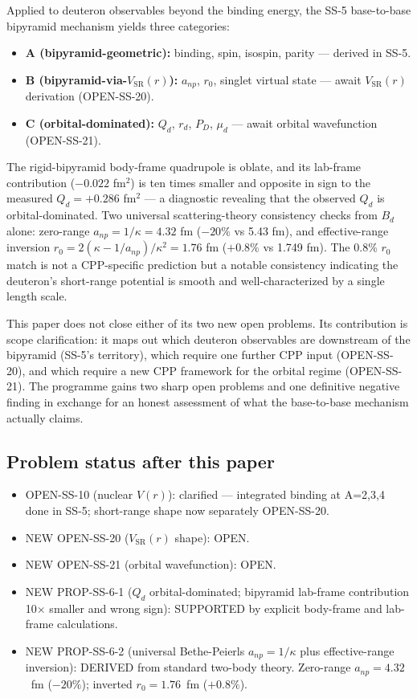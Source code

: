 \documentclass[11pt,letterpaper]{article}
\newcommand{\Bd}{B_{d}}
\newcommand{\Qd}{Q_{d}}
\newcommand{\PD}{P_{D}}
\newcommand{\mud}{\mu_{d}}
\newcommand{\anp}{a_{np}}
\newcommand{\rzero}{r_{0}}
\newcommand{\VSR}{V_{\mathrm{SR}}}
\begin{document}
Applied to deuteron observables beyond the binding energy, the SS-5 base-to-base bipyramid mechanism yields three categories:
\begin{itemize}
\item \textbf{A (bipyramid-geometric):} binding, spin, isospin, parity --- derived in SS-5.
\item \textbf{B (bipyramid-via-$\VSR(r)$):} $\anp$, $\rzero$, singlet virtual state --- await $\VSR(r)$ derivation (OPEN-SS-20).
\item \textbf{C (orbital-dominated):} $\Qd$, $r_d$, $\PD$, $\mud$ --- await orbital wavefunction (OPEN-SS-21).
\end{itemize}

The rigid-bipyramid body-frame quadrupole is oblate, and its lab-frame contribution ($-0.022$ fm$^2$) is ten times smaller and opposite in sign to the measured $\Qd = +0.286$ fm$^2$ --- a diagnostic revealing that the observed $\Qd$ is orbital-dominated. Two universal scattering-theory consistency checks from $\Bd$ alone: zero-range $\anp = 1/\kappa = 4.32$ fm ($-20\%$ vs 5.43 fm), and effective-range inversion $\rzero = 2(\kappa - 1/\anp)/\kappa^2 = 1.76$ fm ($+0.8\%$ vs 1.749 fm). The 0.8\% $\rzero$ match is not a CPP-specific prediction but a notable consistency indicating the deuteron's short-range potential is smooth and well-characterized by a single length scale.

This paper does not close either of its two new open problems. Its contribution is scope clarification: it maps out which deuteron observables are downstream of the bipyramid (SS-5's territory), which require one further CPP input (OPEN-SS-20), and which require a new CPP framework for the orbital regime (OPEN-SS-21). The programme gains two sharp open problems and one definitive negative finding in exchange for an honest assessment of what the base-to-base mechanism actually claims.

\subsection{Problem status after this paper}

\begin{itemize}
\item OPEN-SS-10 (nuclear $V(r)$): clarified --- integrated binding at A=2,3,4 done in SS-5; short-range shape now separately OPEN-SS-20.
\item NEW OPEN-SS-20 ($\VSR(r)$ shape): OPEN.
\item NEW OPEN-SS-21 (orbital wavefunction): OPEN.
\item NEW PROP-SS-6-1 ($\Qd$ orbital-dominated; bipyramid lab-frame contribution 10$\times$ smaller and wrong sign): SUPPORTED by explicit body-frame and lab-frame calculations.
\item NEW PROP-SS-6-2 (universal Bethe-Peierls $\anp = 1/\kappa$ plus effective-range inversion): DERIVED from standard two-body theory. Zero-range $\anp = 4.32$~fm ($-20\%$); inverted $\rzero = 1.76$~fm ($+0.8\%$).
\end{itemize}
\end{document}
